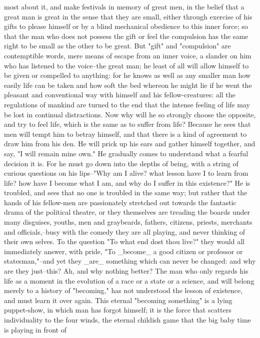 most about it, and make festivals in memory of great men, in the
belief that a great man is great in the sense that they are small,
either through exercise of his gifts to please himself or by a blind
mechanical obedience to this inner force; so that the man who does
not possess the gift or feel the compulsion has the same right to be
small as the other to be great. But "gift" and "compulsion" are
contemptible words, mere means of escape from an inner voice, a
slander on him who has listened to the voice--the great man; he least
of all will allow himself to be given or compelled to anything: for
he knows as well as any smaller man how easily life can be taken and
how soft the bed whereon he might lie if he went the pleasant and
conventional way with himself and his fellow-creatures: all the
regulations of mankind are turned to the end that the intense feeling
of life may be lost in continual distractions. Now why will he so
strongly choose the opposite, and try to feel life, which is the same
as to suffer from life? Because he sees that men will tempt him to
betray himself, and that there is a kind of agreement to draw him
from his den. He will prick up his ears and gather himself together,
and say, "I will remain mine own." He gradually comes to understand
what a fearful decision it is. For he must go down into the depths of
being, with a string of curious questions on his lips--"Why am I
alive? what lesson have I to learn from life? how have I become what
I am, and why do I suffer in this existence?" He is troubled, and
sees that no one is troubled in the same way; but rather that the
hands of his fellow-men are passionately stretched out towards the
fantastic drama of the political theatre, or they themselves are
treading the boards under many disguises, youths, men and graybeards,
fathers, citizens, priests, merchants and officials,--busy with the
comedy they are all playing, and never thinking of their own selves.
To the question "To what end dost thou live?" they would all
immediately answer, with pride, "To _become_ a good citizen or
professor or statesman,"--and yet they _are_ something which can
never be changed: and why are they just--this? Ah, and why nothing
better? The man who only regards his life as a moment in the
evolution of a race or a state or a science, and will belong merely
to a history of "becoming," has not understood the lesson of
existence, and must learn it over again. This eternal "becoming
something" is a lying puppet-show, in which man has forgot himself;
it is the force that scatters individuality to the four winds, the
eternal childish game that the big baby time is playing in front of
